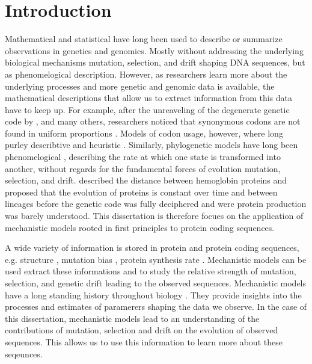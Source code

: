 \chapter{Introduction} 
\label{ch:introduction}

Mathematical and statistical have long been used to describe or summarize observations in genetics and genomics.
Mostly without addressing the underlying biological mechanisms mutation, selection, and drift shaping DNA sequences, but as phenomelogical description.
However, as researchers learn more about the underlying processes and more genetic and genomic data is available, the mathematical descriptions that allow us to extract information from this data have to keep up.
For example, after the unreaveling of the degenerate genetic code by \citet{MatthaeiAndNirenberg1961,NirenbergAndMatthaei1961,Maxwell1962,LederAndNirenberg1964}, and many others, researchers noticed that synonymous codons are not found in uniform proportions \citep{fitch1976,grantham1980,ikemura1981,grantham1981,sharp1988}.
Models of codon usage, however, where long purley describtive and heuristic \citep{ikemura1981,BennetzenAndHall1982,sharp1987,wright1990}.
Similarly, phylogenetic models have long been phenomelogical \citep{JukesAndCantor1969,Dayhoff1978,Kimura1980,felsenstein1981,Altschul1991}, describing the rate at which one state is transformed into another, without regards for the fundamental forces of evolution mutation, selection, and drift.
\citet{ZuckerkandlAndPauling1962} described the distance between hemoglobin proteins and proposed that the evolution of proteins is constant over time and between lineages before the genetic code was fully deciphered and were protein production was barely understood.
This dissertation is therefore focues on the application of mechanistic models rooted in first principles to protein coding sequences.

A wide variety of information is stored in protein and protein coding sequences, e.g. structure \citep{anfinsen1973}, mutation bias \citep{ShahAndGilchrist2011, gilchrist2015}, protein synthesis rate \citep{gilchrist2007,gilchrist2015}. 
Mechanistic models can be used extract these informations and to study the relative strength of mutation, selection, and genetic drift leading to the observed sequences.
Mechanistic models have a long standing history throughout biology \citep{loreau1998,DavisAndPelsor2001,adf2007}. 
They provide insights into the processes and estimates of paramerers shaping the data we observe.
In the case of this dissertation, mechanistic models lead to an understanding of the contributions of mutation, selection and drift on the evolution of observed sequences.
This allows us to use this information to learn more about these seqeunces.

